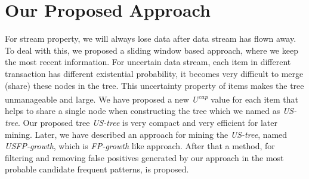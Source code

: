 \documentclass[conference]{IEEEtran}
\begin{document}
\section{Our Proposed Approach}\label{proposedWork}
For stream property, we will always lose data after data stream has flown away. To deal with this, we proposed a sliding window based approach, where we keep the most recent information. For uncertain data stream, each item in different transaction has different existential probability, it becomes very difficult to merge (share) these nodes in the tree. This uncertainty property of items makes the tree unmanageable and large. We have proposed a new \emph{U\textsuperscript{cap}} value for each item that helps to share a single node when constructing the tree which we named as \emph{US-tree}. Our proposed tree \emph{US-tree} is very compact and very efficient for later mining. Later, we have described an approach for mining the \emph{US-tree}, named \emph{USFP-growth}, which is \emph{FP-growth} like approach. After that a method, for filtering and removing false positives generated by our approach in the most probable candidate frequent patterns, is proposed.

%
\end{document}

